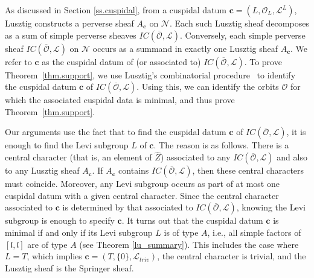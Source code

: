 \documentclass[reqno,11pt]{amsart}
\theoremstyle{remark}
\theoremstyle{remark}
\theoremstyle{definition}
\theoremstyle{definition}
\theoremstyle{definition}
\numberwithin{equation}{section}
\newcommand{\fl}{{\mathfrak l}}
\newcommand{\cl}{\mathcal{L}}
\newcommand{\cn}{\mathcal{N}}
\newcommand{\co}{\mathcal{O}}
\newcommand{\vc}{\mathbf{c}}
\renewcommand{\hat}{\widehat}
\begin{document}
As discussed in Section \ref{ss.cuspidal}, from a  cuspidal datum $\vc = (L,\co_L, \cl^L)$, Lusztig constructs a perverse sheaf $A_{\vc}$ on $\cn$.
Each such Lusztig sheaf decomposes as a sum of simple perverse sheaves $IC(\overline{\co}, \cl)$.  
Conversely, each simple perverse sheaf $IC(\overline{\co}, \cl)$ on $\cn$ occurs as a summand in exactly one Lusztig sheaf $A_{\vc}$.
We refer to $\vc$ as the cuspidal datum of (or associated to) $IC(\overline{\co}, \cl)$.  
To prove Theorem~\ref{thm.support}, we use Lusztig's combinatorial procedure~\cite{Lu84} to identify the cuspidal datum $\vc$ of $IC(\overline{\co}, \cl)$.  Using this, we can identify the orbits $\co$ for which the associated cuspidal data is minimal, and thus prove Theorem~\ref{thm.support}.

Our arguments use the fact that to find the cuspidal datum $\vc$ of $IC(\overline{\co}, \cl)$, it is enough to find the Levi subgroup $L$ of $\vc$.
The reason is as follows.  There is a central character (that is, an element of  $\hat{Z}$) associated to any $IC(\overline{\co}, \cl)$ and also to any Lusztig sheaf $A_{\vc}$.  If $A_{\vc}$ contains $IC(\overline{\co}, \cl)$, then these central characters must coincide.  Moreover, any Levi subgroup occurs as part of at most one cuspidal datum with a given central character.
Since the central character associated to $\vc$ is determined by that associated to $IC(\overline{\co}, \cl)$, knowing the Levi subgroup is
enough to specify $\vc$.  It turns out that the cuspidal datum $\vc$ is minimal  if and only if its Levi subgroup $L$ is of type $A$, i.e., all 
simple factors of $[\fl, \fl]$ are of type $A$ (see Theorem \ref{lu_summary}).  
This includes the case where $L = T$, which implies $\vc = (T, \{ 0 \}, \cl_{triv})$,
the central character is trivial, and the Lusztig sheaf is the Springer sheaf.
\end{document}

